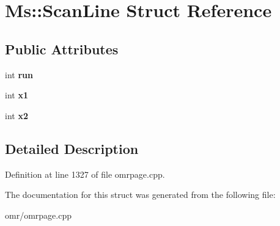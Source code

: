 \hypertarget{struct_ms_1_1_scan_line}{}\section{Ms\+:\+:Scan\+Line Struct Reference}
\label{struct_ms_1_1_scan_line}
\subsection*{Public Attributes}
\begin{DoxyCompactItemize}
\item 
\mbox{\label{struct_ms_1_1_scan_line_a8d55e8849fb2fd3a6373ef14f61420cc}} 
int {\bfseries run}
\item 
\mbox{\label{struct_ms_1_1_scan_line_a87fbc53faa74695b4369ca816d42718b}} 
int {\bfseries x1}
\item 
\mbox{\label{struct_ms_1_1_scan_line_a1ce208075a7a8570405fb88c7c82372a}} 
int {\bfseries x2}
\end{DoxyCompactItemize}


\subsection{Detailed Description}


Definition at line 1327 of file omrpage.\+cpp.



The documentation for this struct was generated from the following file\+:\begin{DoxyCompactItemize}
\item 
omr/omrpage.\+cpp\end{DoxyCompactItemize}
